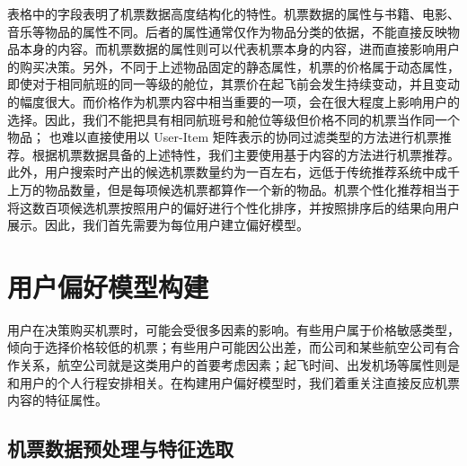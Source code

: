 表格中的字段表明了机票数据高度结构化的特性。机票数据的属性与书籍、电影、音乐等物品的属性不同。后者的属性通常仅作为物品分类的依据，不能直接反映物品本身的内容。而机票数据的属性则可以代表机票本身的内容，进而直接影响用户的购买决策。另外，不同于上述物品固定的静态属性，机票的价格属于动态属性，即使对于相同航班的同一等级的舱位，其票价在起飞前会发生持续变动，并且变动的幅度很大。而价格作为机票内容中相当重要的一项，会在很大程度上影响用户的选择。因此，我们不能把具有相同航班号和舱位等级但价格不同的机票当作同一个物品；
也难以直接使用以 User-Item 矩阵表示的协同过滤类型的方法进行机票推荐。根据机票数据具备的上述特性，我们主要使用基于内容的方法进行机票推荐。
此外，用户搜索时产出的候选机票数量约为一百左右，远低于传统推荐系统中成千上万的物品数量，但是每项候选机票都算作一个新的物品。机票个性化推荐相当于将这数百项候选机票按照用户的偏好进行个性化排序，并按照排序后的结果向用户展示。因此，我们首先需要为每位用户建立偏好模型。

\section{用户偏好模型构建}

用户在决策购买机票时，可能会受很多因素的影响。有些用户属于价格敏感类型，倾向于选择价格较低的机票；有些用户可能因公出差，而公司和某些航空公司有合作关系，航空公司就是这类用户的首要考虑因素；起飞时间、出发机场等属性则是和用户的个人行程安排相关。在构建用户偏好模型时，我们着重关注直接反应机票内容的特征属性。

\subsection{机票数据预处理与特征选取}

